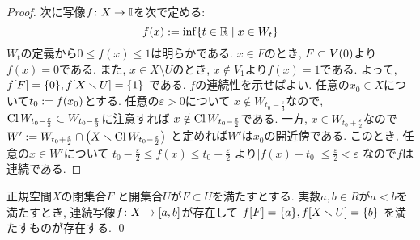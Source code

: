 \documentclass[uplatex, dvipdfmx, a4paper, 12pt, class=jsbook, crop=false]{standalone}
\begin{document}
\begin{proof}
	次に写像\( f\colon X\to\mathbb{I} \)を次で定める:
	\[ f(x) \defeq \inf  \setcomp{t \in \R}{x \in W_t} \]
	\( W_t \)の定義から\( 0 \leq f(x) \leq 1 \)は明らかである.
	\( x \in F \)のとき, \( F \subset V\lrparen{0} \)より\( f(x) = 0 \)である.
	また, \( x \in X \setminus U \)のとき, \( x \notin V_1 \)より\( f(x) = 1 \)である.
	よって, \( \mapset{f}{F} = \lrbrace{0}, \mapset{f}{X \setminus U} = \lrbrace{1} \)
	である.
	\( f \)の連続性を示せばよい.
	任意の\( x_0 \in X \)について\( t_0 \mathrel{:=} f(x_0) \)とする.
	任意の\( \varepsilon > 0 \)について
	\( x \notin W_{t_0 - \frac{\varepsilon}{3}} \)なので,
	\( \mathop{\mathrm{Cl}}\nolimits W_{t_0 - \frac{\varepsilon}{2}} \subset
	W_{t_0 - \frac{\varepsilon}{3}} \)に注意すれば
	\( x \notin \mathop{\mathrm{Cl}}\nolimits W_{t_0 - \frac{\varepsilon}{2}} \)である.
	一方, \( x \in W_{t_0 + \frac{\varepsilon}{2}} \)なので
	\( W' \defeq W_{t_0 + \frac{\varepsilon}{2}} \cap
	\lrparen{X \setminus \topcl W_{t_0 - \frac{\varepsilon}{2}}} \)
	と定めれば\( W' \)は\( x_0 \)の開近傍である.
	このとき, 任意の\( x \in W' \)について
	\( t_0 - \frac{\varepsilon}{2} \leq f(x) \leq t_0 + \frac{\varepsilon}{2} \)
	より\( |f(x) - t_0| \leq \frac{\varepsilon}{2} < \varepsilon \)
	なので\( f \)は連続である.
\end{proof}

\begin{corollary}
	正規空間\( X \)の閉集合\( F \)
	と開集合\( U \)が\( F \subset U \)を満たすとする.
	実数\( a, b \in R \)が\( a < b \)を満たすとき,
	連続写像\( f\colon X\to[a,b] \)が存在して
	\( \mapset{f}{F} = \lrbrace{a}, \mapset{f}{X \setminus U} = \lrbrace{b} \)
	を満たすものが存在する.
	\qed
\end{corollary}
\end{document}
